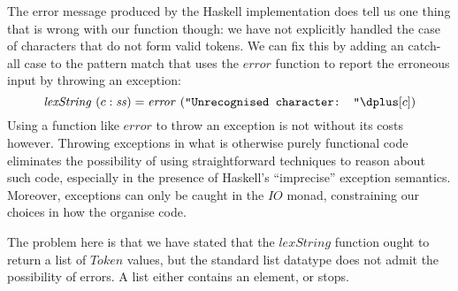 The error message produced by the Haskell implementation does tell us
one thing that is wrong with our function though: we have not
explicitly handled the case of characters that do not form valid
tokens. We can fix this by adding an catch-all case to the pattern
match that uses the $\mathit{error}$ function to report the erroneous
input by throwing an exception:
\begin{displaymath}
  \mathit{lexString}~(c : \mathit{ss}) = \mathit{error}~(\texttt{"Unrecognised character: "} \dplus [c])
\end{displaymath}
Using a function like $\mathit{error}$ to throw an exception is not
without its costs however. Throwing exceptions in what is otherwise
purely functional code eliminates the possibility of using
straightforward techniques to reason about such code, especially in
the presence of Haskell's ``imprecise'' exception semantics. Moreover,
exceptions can only be caught in the $\mathit{IO}$ monad, constraining
our choices in how the organise code.

The problem here is that we have stated that the $\mathit{lexString}$
function ought to return a list of $\mathit{Token}$ values, but the
standard list datatype does not admit the possibility of errors. A
list either contains an element, or stops.

